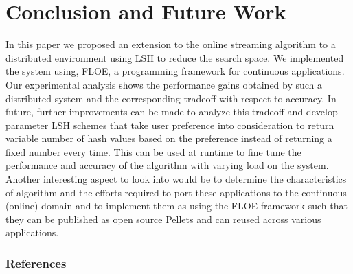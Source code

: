 \documentclass{article} %
\begin{document}
\section{Conclusion and Future Work}
\label{sec:future}
In this paper we proposed an extension to the online streaming algorithm to a distributed environment using LSH to reduce the search space. We implemented the system using, FLOE, a programming framework for continuous applications. Our experimental analysis shows the performance gains obtained by such a distributed system and the corresponding tradeoff with respect to accuracy. In future, further improvements can be made to analyze this tradeoff and develop parameter LSH schemes that take user preference into consideration to return variable number of hash values based on the preference instead of returning a fixed number every time. This can be used at runtime to fine tune the performance and accuracy of the algorithm with varying load on the system. Another interesting aspect to look into would be to determine the characteristics of algorithm and the efforts required to port these applications to the continuous (online) domain and to implement them as using the FLOE framework such that they can be published as open source Pellets and can reused across various applications.


\subsubsection*{References}
\end{document}
